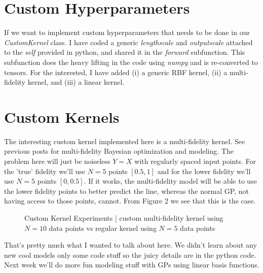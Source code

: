 \documentclass[12pt]{article}
\begin{document}
\section{Custom Hyperparameters}

If we want to implement custom hyperparameters that needs to be done in our \emph{CustomKernel} class. I have coded a generic \emph{lengthscale} and \emph{outputscale} attached to the \emph{self} provided in python, and shared it in the \emph{forward} subfunction. This subfunction does the heavy lifting in the code using \emph{numpy} and is re-converted to tensors. For the interested, I have added (i) a generic RBF kernel, (ii) a multi-fidelity kernel, and (iii) a linear kernel.

\section{Custom Kernels}

The interesting custom kernel implemented here is a multi-fidelity kernel. See previous posts for multi-fidelity Bayesian optimization and modeling. The problem here will just be noiseless $Y=X$ with regularly spaced input points. For the 'true' fidelity we'll use $N=5$ points $[0.5,1]$ and for the lower fidelity we'll use $N=5$ points $[0,0.5]$. If it works, the multi-fidelity model will be able to use the lower fidelity points to better predict the line, whereas the normal GP, not having access to those points, cannot. From Figure 2 we see that this is the case. 

\begin{figure}[h]
\centering
{}
\caption{Custom Kernel Experiments | custom multi-fidelity kernel using $N=10$ data points vs regular kernel using $N=5$ data points}
\end{figure}

\vspace{5mm}

That's pretty much what I wanted to talk about here. We didn't learn about any new cool models only some code stuff so the juicy details are in the python code. Next week we'll do more fun modeling stuff with GPs using linear basis functions.
\end{document}
